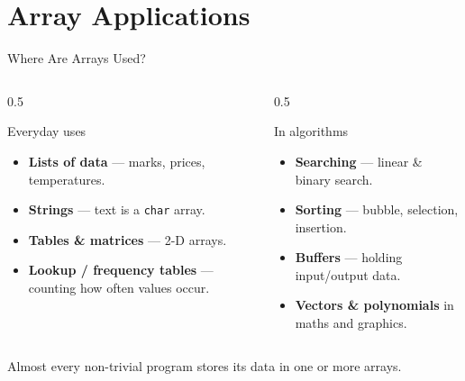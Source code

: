 \documentclass[aspectratio=169]{beamer}
\begin{document}
	\section{Array Applications}
	\begin{frame}{Where Are Arrays Used?}
		\begin{columns}[T]
			\begin{column}{0.5\textwidth}
				\begin{block}{Everyday uses}
					\begin{itemize}\small
						\item \textbf{Lists of data} --- marks, prices, temperatures.
						\item \textbf{Strings} --- text is a \texttt{char} array.
						\item \textbf{Tables \& matrices} --- 2-D arrays.
						\item \textbf{Lookup / frequency tables} --- counting how often values occur.
					\end{itemize}
				\end{block}
			\end{column}
			\begin{column}{0.5\textwidth}
				\begin{block}{In algorithms}
					\begin{itemize}\small
						\item \textbf{Searching} --- linear \& binary search.
						\item \textbf{Sorting} --- bubble, selection, insertion.
						\item \textbf{Buffers} --- holding input/output data.
						\item \textbf{Vectors \& polynomials} in maths and graphics.
					\end{itemize}
				\end{block}
			\end{column}
		\end{columns}
		\vspace{0.15cm}
		\centering\footnotesize Almost every non-trivial program stores its data in one or more arrays.
	\end{frame}
\end{document}
